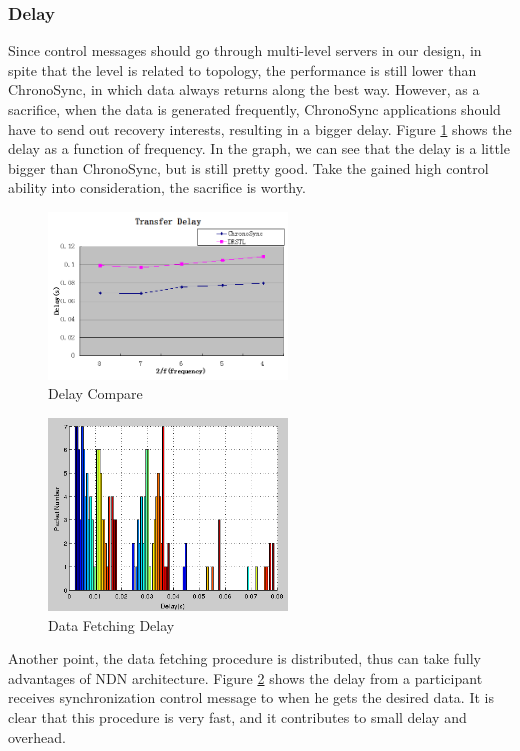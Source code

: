 \documentclass[conference]{IEEEtran}
\begin{document}
\subsubsection{Delay}
Since control messages should go through multi-level servers in our design,
in spite that the level is related to topology,
the performance is still lower than ChronoSync,
in which data always returns along the best way.
However, as a sacrifice, when the data is generated frequently,
ChronoSync applications should have to send out recovery interests,
resulting in a bigger delay. Figure \ref{delay_compare}
shows the delay as a function of frequency.
In the graph, we can see that the delay is a little bigger than ChronoSync,
but is still pretty good. Take the gained high control ability into consideration,
the sacrifice is worthy.
\begin{figure}[!t]
\centering
\includegraphics[width=2.5in]{../png/delay-compare.png}
\caption{Delay Compare}
\label{delay_compare}
\end{figure}

\begin{figure}[!t]
\centering
\includegraphics[width=2.5in]{../png/data-fetch-delay.png}
\caption{Data Fetching Delay}
\label{data_fetch_delay}
\end{figure}
Another point, the data fetching procedure is distributed,
thus can take fully advantages of NDN architecture.
Figure \ref{data_fetch_delay} shows the delay from a participant
receives synchronization control message to when he gets the desired data.
It is clear that this procedure is very fast,
and it contributes to small delay and overhead.
\end{document}
